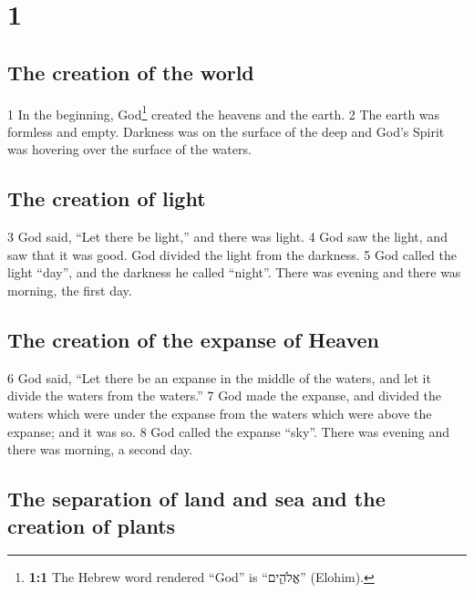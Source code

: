\hypertarget{section}{%
\section{1}\label{section}}

\hypertarget{the-creation-of-the-world}{%
\subsection{The creation of the world}\label{the-creation-of-the-world}}

{1} In the beginning, God\footnote{\textbf{1:1} The Hebrew word rendered
  ``God'' is ``{אֱלֹהִ֑ים}'' (Elohim).} created the heavens and the
earth. {2} The earth was formless and empty. Darkness was on the surface
of the deep and God's Spirit was hovering over the surface of the
waters.

\hypertarget{the-creation-of-light}{%
\subsection{The creation of light}\label{the-creation-of-light}}

{3} God said, ``Let there be light,'' and there was light. {4} God saw
the light, and saw that it was good. God divided the light from the
darkness. {5} God called the light ``day'', and the darkness he called
``night''. There was evening and there was morning, the first day.

\hypertarget{the-creation-of-the-expanse-of-heaven}{%
\subsection{The creation of the expanse of
Heaven}\label{the-creation-of-the-expanse-of-heaven}}

{6} God said, ``Let there be an expanse in the middle of the waters, and
let it divide the waters from the waters.'' {7} God made the expanse,
and divided the waters which were under the expanse from the waters
which were above the expanse; and it was so. {8} God called the expanse
``sky''. There was evening and there was morning, a second day.

\hypertarget{the-separation-of-land-and-sea-and-the-creation-of-plants}{%
\subsection{The separation of land and sea and the creation of
plants}\label{the-separation-of-land-and-sea-and-the-creation-of-plants}}

